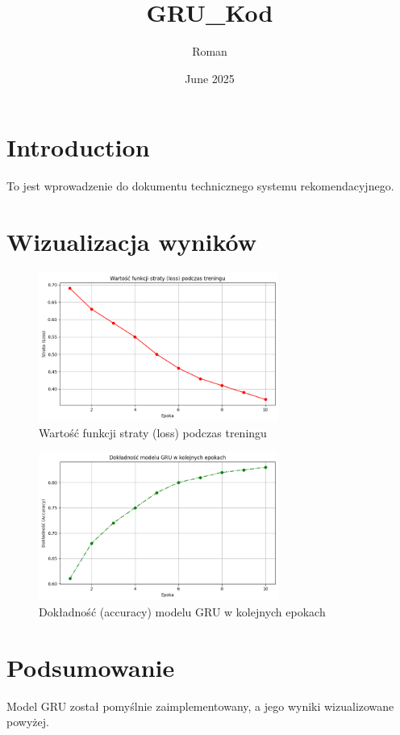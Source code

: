 \documentclass{article}
\title{GRU\_Kod}
\author{Roman}
\date{June 2025}
\begin{document}
\maketitle

\section{Introduction}
To jest wprowadzenie do dokumentu technicznego systemu rekomendacyjnego.

\section{Wizualizacja wyników}

\begin{figure}[h]
\centering
\includegraphics[width=0.7\textwidth]{loss_plot.png}
\caption{Wartość funkcji straty (loss) podczas treningu}
\end{figure}

\begin{figure}[h]
\centering
\includegraphics[width=0.7\textwidth]{accuracy_plot.png}
\caption{Dokładność (accuracy) modelu GRU w kolejnych epokach}
\end{figure}

\section{Podsumowanie}
Model GRU został pomyślnie zaimplementowany, a jego wyniki wizualizowane powyżej.
\end{document}
